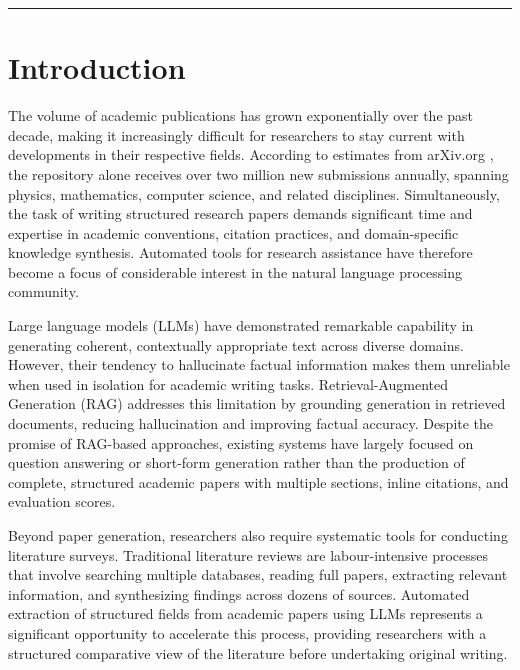 \documentclass[12pt, a4paper]{article}
\begin{document}
\noindent\rule{\linewidth}{0.5pt}

\vspace{1em}

\section{Introduction}

The volume of academic publications has grown exponentially over the past decade,
making it increasingly difficult for researchers to stay current with developments
in their respective fields. According to estimates from arXiv.org \cite{arxiv2024},
the repository alone receives over two million new submissions annually, spanning
physics, mathematics, computer science, and related disciplines. Simultaneously,
the task of writing structured research papers demands significant time and expertise
in academic conventions, citation practices, and domain-specific knowledge synthesis.
Automated tools for research assistance have therefore become a focus of considerable
interest in the natural language processing community.

Large language models (LLMs) \cite{brown2020} have demonstrated remarkable
capability in generating coherent, contextually appropriate text across diverse
domains. However, their tendency to hallucinate factual information \cite{ouyang2022}
makes them unreliable when used in isolation for academic writing tasks.
Retrieval-Augmented Generation (RAG) \cite{lewis2020} addresses this limitation
by grounding generation in retrieved documents, reducing hallucination and
improving factual accuracy. Despite the promise of RAG-based approaches, existing
systems have largely focused on question answering or short-form generation rather
than the production of complete, structured academic papers with multiple sections,
inline citations, and evaluation scores.

Beyond paper generation, researchers also require systematic tools for conducting
literature surveys. Traditional literature reviews are labour-intensive processes
that involve searching multiple databases, reading full papers, extracting relevant
information, and synthesizing findings across dozens of sources. Automated extraction
of structured fields from academic papers using LLMs represents a significant
opportunity to accelerate this process, providing researchers with a structured
comparative view of the literature before undertaking original writing.
\end{document}
